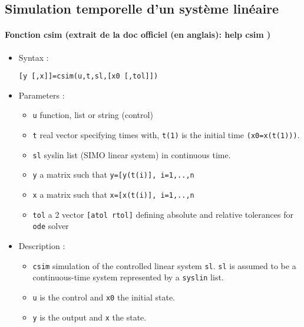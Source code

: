 \newpage

\subsection{Simulation temporelle d'un système linéaire}

\begin{doc}
\paragraph{Fonction csim (extrait de la doc officiel (en anglais): help csim )}
\begin{itemize}
    \item Syntax :
    \begin{code}
\begin{verbatim}
[y [,x]]=csim(u,t,sl,[x0 [,tol]])
\end{verbatim}
    \end{code}
    \item Parameters :
    \begin{itemize}
        \item \verb?u?  function, list or string (control)
        \item \verb?t?  real vector specifying times with, \verb?t(1)? is the initial time \verb?(x0=x(t(1)))?.
        \item \verb?sl? syslin list (SIMO linear system) in continuous time.
        \item \verb?y?  a matrix such that \verb?y=[y(t(i)], i=1,..,n?
        \item \verb?x?  a matrix such that \verb?x=[x(t(i)], i=1,..,n?
        \item \verb?tol? a 2 vector \verb?[atol rtol]? defining absolute and relative tolerances for \verb?ode? solver
    \end{itemize}

    \item Description :

    \begin{itemize} 
        \item \verb?csim? simulation of the controlled linear system \verb?sl?. 
              \verb?sl? is assumed to be a continuous-time system represented by a \verb?syslin? list.
        \item \verb?u?  is the control and \verb?x0? the initial state.
        \item \verb?y?  is the output and \verb?x? the state.
    \end{itemize}


\end{itemize}
\end{doc}
